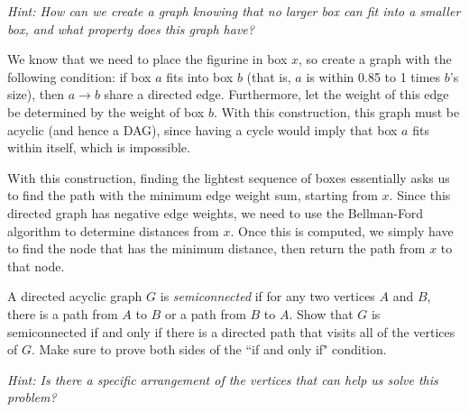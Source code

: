 \documentclass[10.5pt]{article}
\begin{document}
\begin{subparts}
\textit{Hint: How can we create a graph knowing that no larger box can fit into a smaller box, and what property does this graph have?}

\begin{solution}
	We know that we need to place the figurine in box $x$, so create a graph with the following condition:
	if box $a$ fits into box $b$ (that is, $a$ is within 0.85 to 1 times $b$'s size), then $a \to b$ share 
	a directed edge. Furthermore, let the weight of this edge be determined by the weight of box $b$. 
	With this construction, this graph must be acyclic (and hence a DAG), since having a cycle would imply that
	box $a$ fits within itself, which is impossible. 

	With this construction, finding the lightest sequence of boxes essentially asks us to find the path with the 
	minimum edge weight sum, starting from $x$. Since this directed graph has negative edge weights, we need 
	to use the Bellman-Ford algorithm to determine distances from $x$. Once this is computed, we simply 
	have to find the node that has the minimum distance, then return the path from $x$ to that node.  
\end{solution}
\end{subparts}
\pagebreak
{}

A directed acyclic graph $G$ is \emph{semiconnected} if for
any two vertices $A$ and $B$, there is a path from $A$ to $B$ or a path from $B$ to $A$. Show that $G$ is semiconnected if and only if there is a directed path that visits all of the vertices of $G$. Make sure to prove both sides of the ``if and only if" condition.

\emph{Hint: Is there a specific arrangement of the vertices that can help us solve this problem?}
\end{document}
